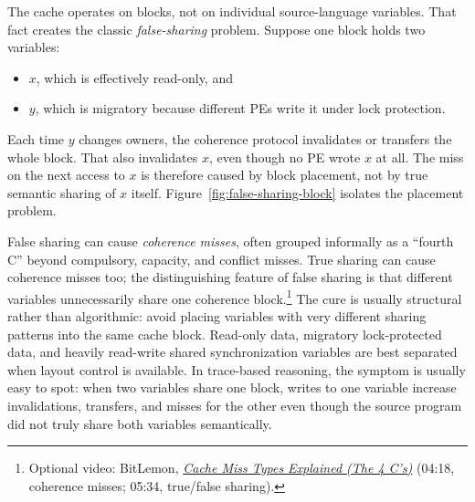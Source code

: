 The cache operates on blocks, not on individual source-language variables.
That fact creates the classic \textit{false-sharing} problem.
Suppose one block holds two variables:
\begin{itemize}
    \item $x$, which is effectively read-only, and
    \item $y$, which is migratory because different PEs write it under lock protection.
\end{itemize}
Each time $y$ changes owners, the coherence protocol invalidates or transfers the whole block.
That also invalidates $x$, even though no PE wrote $x$ at all.
The miss on the next access to $x$ is therefore caused by block placement, not by true semantic sharing of $x$ itself.
Figure~\ref{fig:false-sharing-block} isolates the placement problem.


False sharing can cause \textit{coherence misses}, often grouped informally as a ``fourth C'' beyond compulsory, capacity, and conflict misses.
True sharing can cause coherence misses too; the distinguishing feature of false sharing is that different variables unnecessarily share one coherence block.\footnote{Optional video: BitLemon, \href{https://youtu.be/YXkfmyb0_eA?t=258}{\emph{Cache Miss Types Explained (The 4 C's)}} (04:18, coherence misses; 05:34, true/false sharing).}
The cure is usually structural rather than algorithmic: avoid placing variables with very different sharing patterns into the same cache block.
Read-only data, migratory lock-protected data, and heavily read-write shared synchronization variables are best separated when layout control is available.
In trace-based reasoning, the symptom is usually easy to spot: when two variables share one block, writes to one variable increase invalidations, transfers, and misses for the other even though the source program did not truly share both variables semantically.


